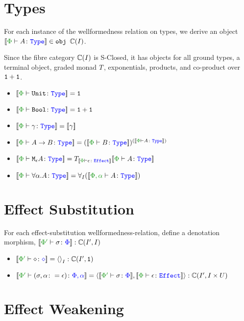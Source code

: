 \documentclass{report}
\begin{document}
\section{Types}
  
For each instance of the wellformedness relation on types, we derive an object $\deno{\typerelation{\P}{A}{\type}}\in\obj\C(I)$.

Since the fibre category $\mathbb{C}(I)$ is S-Closed, it has objects for all ground types, a terminal object, graded monad $T_{}{}$, exponentials, products, and co-product over $\texttt{1}+\texttt{1}$.

\begin{itemize}
    \item $\deno{\typerelation{\P}{\U}{\type}} = \1$
    
    \item $\deno{\typerelation{\P}{\B}{\type}} = \1+\1$
    
    \item $\deno{\typerelation{\P}{\g}{\type}} = \deno{\g} $
    
    \item $\deno{\typerelation{\P}{\ab}{\type}} = (\deno{\typerelation{\P}{B}{\type}})^{(\deno{\typerelation{\P}{A}{\type}})}$
    
    \item $\deno{\typerelation{\P}{\mea}{\type}} =\T{\deno{\typerelation{\P}{\e}{\effect}}}{\deno{\typerelation{\P}{A}{\type}}}$
    \item $\deno{\typerelation{\P}{\all{\a}{A}}{\type}} =\allI(\deno{\typerelation{\P,\a}{A}{\type}})$
\end{itemize}

\section{Effect Substitution}
For each effect-substitution wellformedness-relation, define a denotation morphism, $\deno{\typerelation{\P'}{\si}{\P}}: \cii$

\begin{itemize}
    \item $\deno{\typerelation{\P'}{\nil}{\nil}} = \term{I}: \C(I', \1)$
    \item $\deno{\typerelation{\P'}{(\si, \a\setto\e)}{\P,\a}} = \pr{\deno{\typerelation{\P'}{\si}{\P}}}{\deno{\typerelation{\P}{\e}{\effect}}}: \C(I', I\times U)$
\end{itemize}

\section{Effect Weakening}
\end{document}
